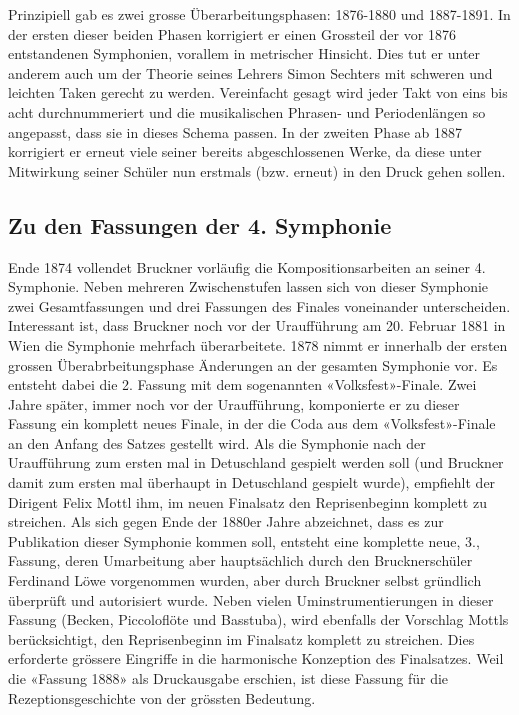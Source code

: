Prinzipiell gab es zwei grosse Überarbeitungsphasen: 1876-1880 und 1887-1891.
In der ersten dieser beiden Phasen korrigiert er einen Grossteil der vor 1876 entstandenen Symphonien, vorallem in metrischer Hinsicht.
Dies tut er unter anderem auch um der Theorie seines Lehrers Simon Sechters mit schweren und leichten Taken gerecht zu werden.
Vereinfacht gesagt wird jeder Takt von eins bis acht durchnummeriert und die musikalischen Phrasen- und Periodenlängen so angepasst, dass sie in dieses Schema passen.
In der zweiten Phase ab 1887 korrigiert er erneut viele seiner bereits abgeschlossenen Werke, da diese unter Mitwirkung seiner Schüler nun erstmals (bzw. erneut) in den Druck gehen sollen.


\subsection{Zu den Fassungen der 4. Symphonie}

Ende 1874 vollendet Bruckner vorläufig die Kompositionsarbeiten an seiner 4. Symphonie.
Neben mehreren Zwischenstufen lassen sich von dieser Symphonie zwei Gesamtfassungen und drei Fassungen des Finales voneinander unterscheiden.
Interessant ist, dass Bruckner noch vor der Uraufführung am 20. Februar 1881 in Wien die Symphonie mehrfach überarbeitete.
1878 nimmt er innerhalb der ersten grossen Überabrbeitungsphase Änderungen an der gesamten Symphonie vor.
Es entsteht dabei die 2. Fassung mit dem sogenannten «Volksfest»-Finale.
Zwei Jahre später, immer noch vor der Uraufführung, komponierte er zu dieser Fassung ein komplett neues Finale, in der die Coda aus dem «Volksfest»-Finale an den Anfang des Satzes gestellt wird.
Als die Symphonie nach der Uraufführung zum ersten mal in Detuschland gespielt werden soll (und Bruckner damit zum ersten mal überhaupt in Detuschland gespielt wurde), empfiehlt der Dirigent Felix Mottl ihm, im neuen Finalsatz den Reprisenbeginn komplett zu streichen.
Als sich gegen Ende der 1880er Jahre abzeichnet, dass es zur Publikation dieser Symphonie kommen soll, entsteht eine komplette neue, 3., Fassung, deren Umarbeitung aber hauptsächlich durch den Brucknerschüler Ferdinand Löwe vorgenommen wurden, aber durch Bruckner selbst gründlich überprüft und autorisiert wurde.
Neben vielen Uminstrumentierungen in dieser Fassung (Becken, Piccoloflöte und Basstuba), wird ebenfalls der Vorschlag Mottls berücksichtigt, den Reprisenbeginn im Finalsatz komplett zu streichen.
Dies erforderte grössere Eingriffe in die harmonische Konzeption des Finalsatzes.
Weil die «Fassung 1888» als Druckausgabe erschien, ist diese Fassung für die Rezeptionsgeschichte von der grössten Bedeutung.

